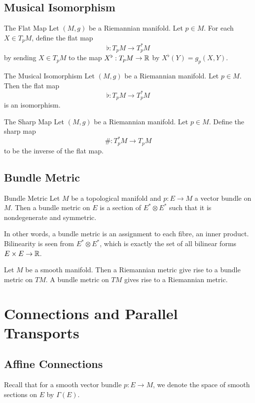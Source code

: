\documentclass[a4paper]{article}
\begin{document}
\subsection{Musical Isomorphism}
\begin{defn}{The Flat Map}{} Let $(M,g)$ be a Riemannian manifold. Let $p\in M$. For each $X\in T_pM$, define the flat map $$\flat:T_pM\to T_p^\ast M$$ by sending $X\in T_pM$ to the map $X^\flat:T_pM\to\mathbb{R}$ by $X^\flat(Y)=g_p(X,Y)$. 
\end{defn}

\begin{thm}{The Musical Isomorphism}{} Let $(M,g)$ be a Riemannian manifold. Let $p\in M$. Then the flat map $$\flat:T_pM\to T_p^\ast M$$ is an isomorphism. 
\end{thm}

\begin{defn}{The Sharp Map}{} Let $(M,g)$ be a Riemannian manifold. Let $p\in M$. Define the sharp map $$\#:T_p^\ast M\to T_pM$$ to be the inverse of the flat map. 
\end{defn}

\subsection{Bundle Metric}
\begin{defn}{Bundle Metric}{} Let $M$ be a topological manifold and $p:E\to M$ a vector bundle on $M$. Then a bundle metric on $E$ is a section of $E^\ast\otimes E^\ast$ such that it is nondegenerate and symmetric. 
\end{defn}

In other words, a bundle metric is an assignment to each fibre, an inner product. Bilinearity is seen from $E^\ast\otimes E^\ast$, which is exactly the set of all bilinear forms $E\times E\to\mathbb{R}$. 

\begin{prp}{}{} Let $M$ be a smooth manifold. Then a Riemannian metric give rise to a bundle metric on $TM$. A bundle metric on $TM$ gives rise to a Riemannian metric. 
\end{prp}

\pagebreak
\section{Connections and Parallel Transports}
\subsection{Affine Connections}
Recall that for a smooth vector bundle $p:E\to M$, we denote the space of smooth sections on $E$ by $\Gamma(E)$. 
\end{document}
